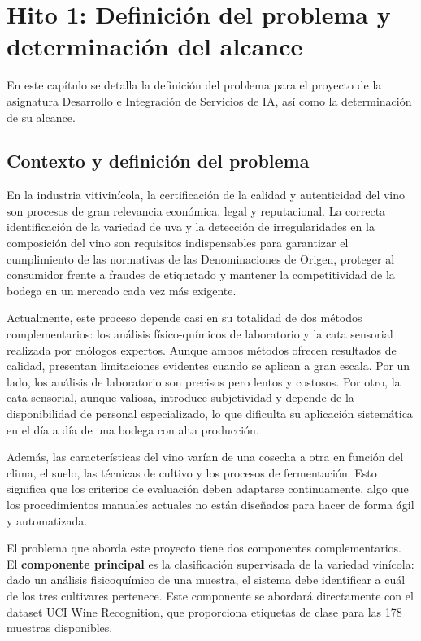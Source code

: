 \chapter{Hito 1: Definición del problema y determinación del alcance}

En este capítulo se detalla la definición del problema para el proyecto de la 
asignatura Desarrollo e Integración de Servicios de IA, así como la determinación de 
su alcance.

\section{Contexto y definición del problema}

En la industria vitivinícola, la certificación de la calidad y autenticidad del 
vino son procesos de gran relevancia económica, legal y reputacional. La correcta 
identificación de la variedad de uva y la detección de irregularidades en la 
composición del vino son requisitos indispensables para garantizar el cumplimiento 
de las normativas de las Denominaciones de Origen, proteger al consumidor frente a 
fraudes de etiquetado y mantener la competitividad de la bodega en un mercado 
cada vez más exigente.

Actualmente, este proceso depende casi en su totalidad de dos métodos 
complementarios: los análisis físico-químicos de laboratorio y la cata sensorial 
realizada por enólogos expertos. Aunque ambos métodos ofrecen resultados de calidad, 
presentan limitaciones evidentes cuando se aplican a gran escala. Por un lado, los 
análisis de laboratorio son precisos pero lentos y costosos. Por otro, la cata 
sensorial, aunque valiosa, introduce subjetividad y depende de la disponibilidad 
de personal especializado, lo que dificulta su aplicación sistemática en el día 
a día de una bodega con alta producción.

Además, las características del vino varían de una cosecha a otra en función del clima, 
el suelo, las técnicas de cultivo y los procesos de fermentación. Esto significa que 
los criterios de evaluación deben adaptarse continuamente, algo que los procedimientos 
manuales actuales no están diseñados para hacer de forma ágil y automatizada.

El problema que aborda este proyecto tiene dos componentes complementarios. 
El \textbf{componente principal} es la clasificación supervisada de la 
variedad vinícola: dado un análisis fisicoquímico de una muestra, el sistema 
debe identificar a cuál de los tres cultivares pertenece. Este componente 
se abordará directamente con el dataset UCI Wine Recognition, que proporciona 
etiquetas de clase para las 178 muestras disponibles.

